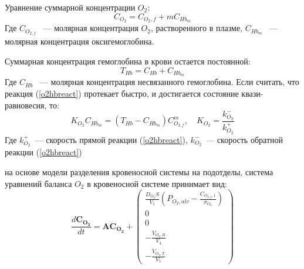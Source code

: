 Уравнение суммарной концентрации \( O_{2}\):
\begin{equation}
C_{O_{2}}=C_{O_{2},f}+mC_{Hb_{m}}
\label{hbEq}
\end{equation}
Где \( C_{O_{2,f}}\) ~--- молярная концентрация \( O_{2}\), растворенного в плазме, \( C_{Hb_{m}}\) ~--- молярная концентрация оксигемоглобина.

Суммарная концентрация гемоглобина в крови остается постоянной:
\begin{equation}
T_{Hb}=C_{Hb} + C_{Hb_{m}}
\end{equation}
Где \( C_{Hb}\) ~--- молярная концентрация несвязанного гемоглобина.
Если считать, что реакция (\ref{o2hbreact}) протекает быстро, и достигается состояние квази-равновесия, то:
\begin{equation}
K_{O_{2}}C_{Hb_{m}}=\left(T_{Hb}-C_{Hb_{m}}\right)C_{O_{2,f}}^m,\quad K_{O_{2}}=\frac{k_{O_{2}}^{-}}{k_{O_{2}}^{+}}
\label{o2Hbq}
\end{equation}
Где \( k_{O_{2}}^{+}\)~--- скорость прямой реакции (\ref{o2hbreact}), \( k_{O_{2}}^{-}\)~--- скорость обратной реакции (\ref{o2hbreact})

на основе модели разделения кровеносной системы на подотделы, система уравнений баланса \( O_{2}\) в кровеносной системе принимает вид:
\begin{equation}
\displaystyle \frac{d\mathbf{C_{O_{2}}}}{dt}
=\mathbf{A} \mathbf{C_{O_{2}}}+\begin{pmatrix}
\displaystyle \frac{D_{O_{2}}S}{V_{1}}\left(P_{O_{2},alv}-\frac{C_{O_{2,f},1}}{\sigma_{O_{2}}} \right) \\
0 \\
0 \\
\displaystyle -\frac{\dot{V}_{O_{2},B}}{V_{4}} \\
\displaystyle -\frac{\dot{V}_{O_{2},T}}{V_{5}}
\label{o2Full}
\end{pmatrix}
\end{equation}

